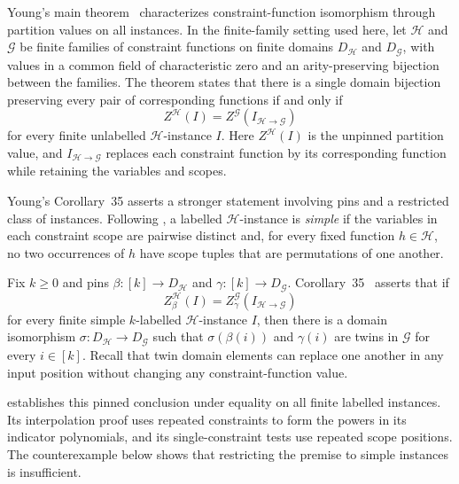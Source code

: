\documentclass[11pt,letterpaper,onecolumn]{article}
\theoremstyle{plain}
\theoremstyle{definition}
\theoremstyle{remark}
\begin{document}
Young's main theorem~\cite[Theorem~8]{Young2025} characterizes
constraint-function isomorphism through partition values on all instances.
In the finite-family setting used here, let $\mathcal H$ and $\mathcal G$
be finite families of constraint functions on finite domains
$D_{\mathcal H}$ and $D_{\mathcal G}$, with values in a common field of
characteristic zero and an arity-preserving bijection between the families.
The theorem states that there is a single domain bijection preserving
every pair of corresponding functions if and only if
\[
  Z^{\mathcal H}(I)
  =Z^{\mathcal G}(I_{\mathcal H\to\mathcal G})
\]
for every finite unlabelled $\mathcal H$-instance $I$.
Here $Z^{\mathcal H}(I)$ is the unpinned partition value, and
$I_{\mathcal H\to\mathcal G}$ replaces each constraint function by its
corresponding function while retaining the variables and scopes.

Young's Corollary~35 asserts a stronger statement involving pins and a
restricted class of instances.  Following
\cite[Definition~4, p.~6]{Young2025}, a labelled $\mathcal H$-instance is
\emph{simple} if the variables in each constraint scope are pairwise
distinct and, for every fixed function $h\in\mathcal H$, no two
occurrences of $h$ have scope tuples that are permutations of one another.

Fix $k\ge0$ and pins $\beta:[k]\to D_{\mathcal H}$ and
$\gamma:[k]\to D_{\mathcal G}$.
Corollary~35~\cite[p.~27]{Young2025} asserts that if
\[
  Z_{\beta}^{\mathcal H}(I)
  =Z_{\gamma}^{\mathcal G}(I_{\mathcal H\to\mathcal G})
\]
for every finite simple $k$-labelled $\mathcal H$-instance $I$, then there
is a domain isomorphism $\sigma:D_{\mathcal H}\to D_{\mathcal G}$ such
that $\sigma(\beta(i))$ and $\gamma(i)$ are twins in $\mathcal G$ for
every $i\in[k]$.  Recall that twin domain elements can replace one
another in any input position without changing any constraint-function
value.

 establishes this pinned conclusion under equality
on all finite labelled instances.  Its interpolation proof uses repeated
constraints to form the powers in its indicator polynomials, and its
single-constraint tests use repeated scope positions.
The counterexample below shows that restricting the premise to simple
instances is insufficient.
\end{document}

